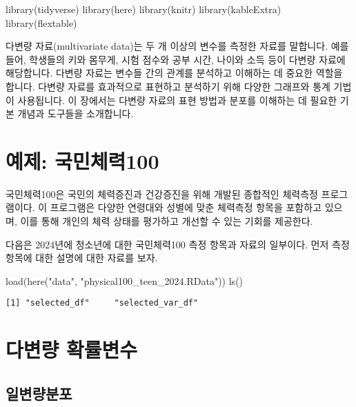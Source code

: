 \documentclass[
  11pt,
  a4paper,
  oneside]{scrbook}
\newenvironment{Shaded}{\begin{snugshade}}{\end{snugshade}}
\newcommand{\FunctionTok}[1]{\textcolor[rgb]{0.28,0.35,0.67}{#1}}
\newcommand{\NormalTok}[1]{\textcolor[rgb]{0.00,0.23,0.31}{#1}}
\newcommand{\StringTok}[1]{\textcolor[rgb]{0.13,0.47,0.30}{#1}}
\begin{document}
\begin{Shaded}
\begin{Highlighting}[]
\FunctionTok{library}\NormalTok{(tidyverse)}
\FunctionTok{library}\NormalTok{(here)}
\FunctionTok{library}\NormalTok{(knitr)}
\FunctionTok{library}\NormalTok{(kableExtra)}
\FunctionTok{library}\NormalTok{(flextable)}
\end{Highlighting}
\end{Shaded}

다변량 자료(multivariate data)는 두 개 이상의 변수를 측정한 자료를
말합니다. 예를 들어, 학생들의 키와 몸무게, 시험 점수와 공부 시간, 나이와
소득 등이 다변량 자료에 해당합니다. 다변량 자료는 변수들 간의 관계를
분석하고 이해하는 데 중요한 역할을 합니다. 다변량 자료를 효과적으로
표현하고 분석하기 위해 다양한 그래프와 통계 기법이 사용됩니다. 이
장에서는 다변량 자료의 표현 방법과 분포를 이해하는 데 필요한 기본 개념과
도구들을 소개합니다.

\section{예제:
국민체력100}\label{uxc608uxc81c-uxad6duxbbfcuxccb4uxb825100}

국민체력100은 국민의 체력증진과 건강증진을 위해 개발된 종합적인 체력측정
프로그램이다. 이 프로그램은 다양한 연령대와 성별에 맞춘 체력측정 항목을
포함하고 있으며, 이를 통해 개인의 체력 상태를 평가하고 개선할 수 있는
기회를 제공한다.

다음은 2024년에 청소년에 대한 국민체력100 측정 항목과 자료의 일부이다.
먼저 측정항목에 대한 설명에 대한 자료를 보자.

\begin{Shaded}
\begin{Highlighting}[]
\FunctionTok{load}\NormalTok{(}\FunctionTok{here}\NormalTok{(}\StringTok{"data"}\NormalTok{, }\StringTok{"physical100\_teen\_2024.RData"}\NormalTok{))}
\FunctionTok{ls}\NormalTok{()}
\end{Highlighting}
\end{Shaded}

\begin{verbatim}
[1] "selected_df"     "selected_var_df"
\end{verbatim}

\section{다변량
확률변수}\label{uxb2e4uxbcc0uxb7c9-uxd655uxb960uxbcc0uxc218}

\subsection{일변량분포}\label{uxc77cuxbcc0uxb7c9uxbd84uxd3ec}
\end{document}
